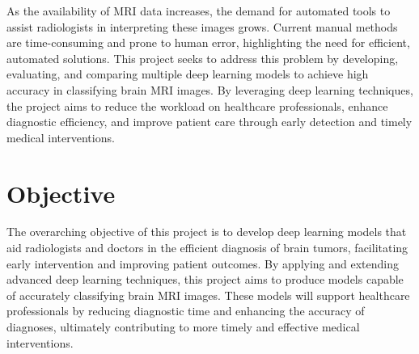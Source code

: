As the availability of MRI data increases, the demand for automated tools to assist radiologists in interpreting these images grows. Current manual methods are time-consuming and prone to human error, highlighting the need for efficient, automated solutions. This project seeks to address this problem by developing, evaluating, and comparing multiple deep learning models to achieve high accuracy in classifying brain MRI images. By leveraging deep learning techniques, the project aims to reduce the workload on healthcare professionals, enhance diagnostic efficiency, and improve patient care through early detection and timely medical interventions.

\section{Objective}\label{s:objective}

The overarching objective of this project is to develop deep learning models that aid radiologists and doctors in the efficient diagnosis of brain tumors, facilitating early intervention and improving patient outcomes. By applying and extending advanced deep learning techniques, this project aims to produce models capable of accurately classifying brain MRI images. These models will support healthcare professionals by reducing diagnostic time and enhancing the accuracy of diagnoses, ultimately contributing to more timely and effective medical interventions.

